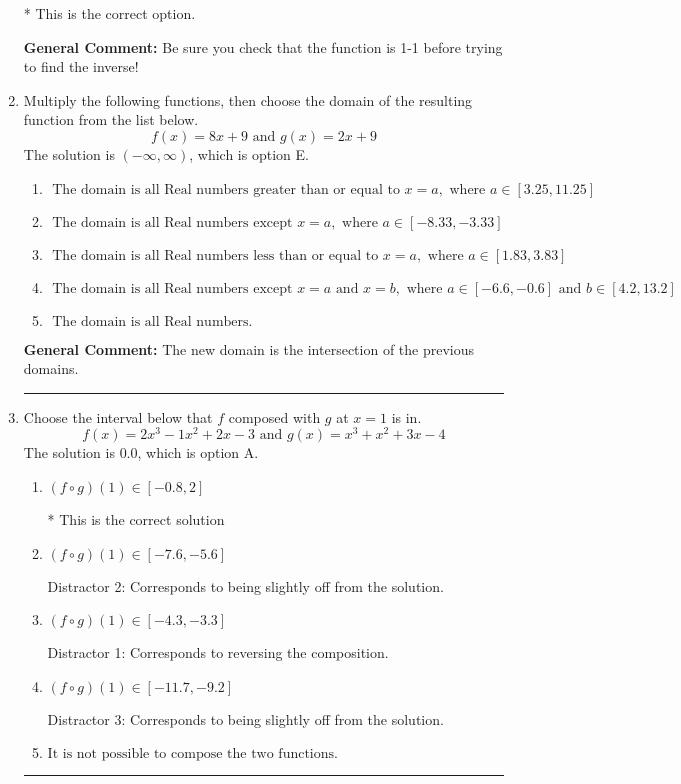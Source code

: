 \documentclass{extbook}[14pt]
\newcommand{\litem}[1]{\item #1

\rule{\textwidth}{0.4pt}}
\begin{document}
\begin{enumerate}
{\begin{enumerate}[label=\Alph*.]
* This is the correct option.
\end{enumerate}

\textbf{General Comment:} Be sure you check that the function is 1-1 before trying to find the inverse!
}
\litem{
Multiply the following functions, then choose the domain of the resulting function from the list below.
\[ f(x) = 8x + 9 \text{ and } g(x) = 2x + 9 \]The solution is \( (-\infty, \infty) \), which is option E.\begin{enumerate}[label=\Alph*.]
\item \( \text{ The domain is all Real numbers greater than or equal to } x = a, \text{ where } a \in [3.25, 11.25] \)


\item \( \text{ The domain is all Real numbers except } x = a, \text{ where } a \in [-8.33, -3.33] \)


\item \( \text{ The domain is all Real numbers less than or equal to } x = a, \text{ where } a \in [1.83, 3.83] \)


\item \( \text{ The domain is all Real numbers except } x = a \text{ and } x = b, \text{ where } a \in [-6.6, -0.6] \text{ and } b \in [4.2, 13.2] \)


\item \( \text{ The domain is all Real numbers. } \)


\end{enumerate}

\textbf{General Comment:} The new domain is the intersection of the previous domains.
}
\litem{
Choose the interval below that $f$ composed with $g$ at $x=1$ is in.
\[ f(x) = 2x^{3} -1 x^{2} +2 x -3 \text{ and } g(x) = x^{3} + x^{2} +3 x -4 \]The solution is \( 0.0 \), which is option A.\begin{enumerate}[label=\Alph*.]
\item \( (f \circ g)(1) \in [-0.8, 2] \)

* This is the correct solution
\item \( (f \circ g)(1) \in [-7.6, -5.6] \)

 Distractor 2: Corresponds to being slightly off from the solution.
\item \( (f \circ g)(1) \in [-4.3, -3.3] \)

 Distractor 1: Corresponds to reversing the composition.
\item \( (f \circ g)(1) \in [-11.7, -9.2] \)

 Distractor 3: Corresponds to being slightly off from the solution.
\item \( \text{It is not possible to compose the two functions.} \)



\end{enumerate}}
\end{enumerate}
\end{document}

